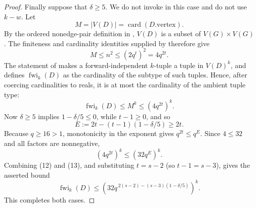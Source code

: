 \begin{proof}
Finally suppose that $\delta\geq5$.  We do not invoke
 in this case and do not use $k-w$.  Let
\[
 M=|V(D)|=\operatorname{card}(D.\mathrm{vertex}).
\]
By the ordered nonedge-pair definition in ,
$V(D)$ is a subset of $V(G)\times V(G)$.  The finiteness and cardinality
identities supplied by  therefore give
\[
 M\leq n^2\leq(2q^t)^2=4q^{2t}. \tag{11}
\]
The statement of  makes a
forward-independent $k$-tuple a tuple in $V(D)^k$, and
 defines $\operatorname{fwi}_k(D)$ as the
cardinality of the subtype of such tuples.  Hence, after coercing
cardinalities to reals, it is at most the cardinality of the ambient tuple
type:
\[
 \operatorname{fwi}_k(D)\leq M^k\leq(4q^{2t})^k. \tag{12}
\]
Now $\delta\geq5$ implies $1-\delta/5\leq0$, while $t-1\geq0$, and so
\[
 E:=2t-(t-1)(1-\delta/5)\geq2t.
\]
Because $q\geq16>1$, monotonicity in the exponent gives
$q^{2t}\leq q^E$.  Since $4\leq32$ and all factors are nonnegative,
\[
 (4q^{2t})^k\leq(32q^E)^k. \tag{13}
\]
Combining (12) and (13), and substituting $t=s-2$ (so $t-1=s-3$), gives
the asserted bound
\[
 \operatorname{fwi}_k(D)\leq
 \left(32q^{\,2(s-2)-(s-3)(1-\delta/5)}\right)^k.
\]
This completes both cases.
\end{proof}
